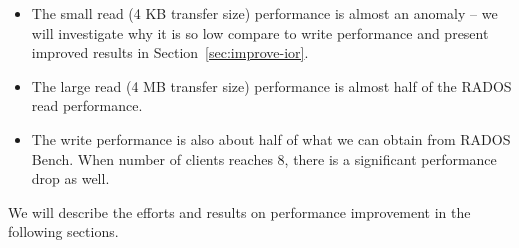 \begin{itemize}

  \item The small read (4 KB transfer size) performance is almost an anomaly
  -- we will investigate why it is so low compare to write performance and
  present improved results in Section~\ref{sec:improve-ior}.

  \item The large read (4 MB transfer size) performance is almost half of the
  RADOS read performance.
   
  \item The write performance is also about half of what we can obtain from
  RADOS Bench. When number of clients reaches 8, there is a significant
  performance drop as well. 

\end{itemize}


We will describe the efforts and results on performance improvement in the
following sections.

